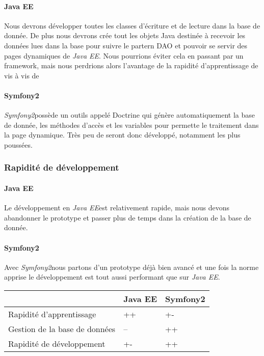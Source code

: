 \paragraph{Java EE}
Nous devrons développer toutes les classes d'écriture et de lecture dans la base de donnée. De plus nous devrons crée tout les objets Java destinée à recevoir les données lues dans la base pour suivre le partern DAO et pouvoir se servir des pages dynamiques de \textit{Java EE}.
Nous pourrions éviter cela en passant par un framework, mais nous perdrions alors l'avantage de la rapidité d'apprentissage de \jee vis à vis de \symfony

\paragraph{Symfony2}
\textit{Symfony2}possède un outils appelé Doctrine qui génère automatiquement la base de donnée, les méthodes d'accès et les variables pour permette le traitement dans la page dynamique. Très peu de seront donc développé, notamment les plus poussées.

\subsubsection{Rapidité de développement}
\paragraph{Java EE}
Le développement en \textit{Java EE}est relativement rapide, mais nous devons abandonner le prototype et passer plus de temps dans la création de la base de donnée.

\paragraph{Symfony2}
Avec \textit{Symfony2}nous partons d'un prototype déjà bien avancé et une fois la norme apprise le développement est tout aussi performant que sur \textit{Java EE}.


\begin{tabular}{|m{125pt}|m{50pt}|m{50pt}|}
	\hline
	\null & \textbf{Java EE} & \textbf{Symfony2} \\
	\hline
	Rapidité d'apprentissage & ++ & +-\\
	\hline
	Gestion de la base de données & -- & ++\\
	\hline
	Rapidité de développement & +- & ++ \\
	\hline
\end{tabular} \vspace*{5mm}

